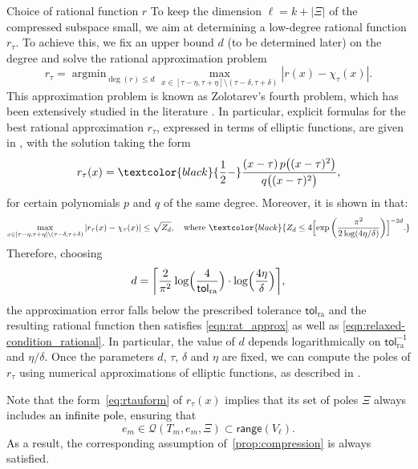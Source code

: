 \documentclass{siamart190516}
\newcommand{\argmin}{\mathop{\arg\min}}
\newcommand{\tol}{\mathsf{tol}}
\newcommand{\range}{\mathsf{range}}
\providecommand{\abs}[1]{\lvert#1\rvert}
\providecommand{\edit}[1]{\textcolor{black}{#1}}
\begin{document}
\begin{paragraph}{Choice of rational function $r$}
To keep the dimension $\ell = k + \abs{\Xi}$ of the compressed subspace small, we aim at determining a low-degree rational function $r_\tau$.
To achieve this, we fix an upper bound $d$ (to be determined later) on the degree and solve the rational approximation problem
\begin{equation*}
r_{\tau} = \argmin_{\deg(r) \le d}
\max_{x \in [\tau - \eta, \tau + \eta] \setminus (\tau - \delta, \tau + \delta)}
\left| r(x) - \chi_{\tau}(x) \right|.
\end{equation*}
This approximation problem is known as Zolotarev's fourth problem, which has been extensively studied in the literature \cite[Sec.~4.3]{petrushev2011rational}.
In particular, explicit formulas for the best rational approximation $r_\tau$, expressed in terms of elliptic functions, are given in \cite[Thm.~4.8]{petrushev2011rational}, with the solution taking the form
\begin{equation} \label{eq:rtauform}
r_{\tau}(x) =\edit{\frac{1}{2}-} \frac{(x - \tau)\, p\bigl((x - \tau)^2\bigr)}{q\bigl((x - \tau)^2\bigr)},
\end{equation}
for certain polynomials $p$ and $q$ of the same degree.
Moreover, it is shown in \cite[Thm.~3.3]{beckermann2017singular} that:
\begin{equation*}
\max_{x \in [\tau - \eta, \tau + \eta] \setminus (\tau - \delta, \tau + \delta)}
\left| r_{\tau}(x) - \chi_{\tau}(x) \right| \leq 
\sqrt{Z_{d}},\quad \text{where } 
\edit{
Z_{d} \leq 
4 \Bigl[\exp\left(\frac{\pi^2}{2 \log(4\eta/\delta)}\right)\Bigr]^{-2d}.}
\end{equation*}
Therefore, choosing
\begin{equation}
    \label{eq:bound_degree}
d = \biggl\lceil \frac{2}{\pi^2}\log\Bigl(\frac{4}{\tol_{\mathrm{ra}}}\Bigr) \cdot  \log\Bigl(\frac{4\eta}{\delta}\Bigr) \biggr\rceil,
\end{equation}
the approximation error falls below the prescribed tolerance $\tol_{\mathrm{ra}}$ and the resulting rational function then satisfies \cref{eqn:rat_approx} as well as \cref{eqn:relaxed-condition_rational}.
In particular, the value of $d$ depends logarithmically on $\tol_{\mathrm{ra}}^{-1}$ and $\eta/\delta$.
Once the parameters $d$, $\tau$, $\delta$ and $\eta$ are fixed, we can compute the poles of $r_\tau$ using numerical approximations of elliptic functions, as described in \cite{Nakatsukasa2016}.

Note that the form~\cref{eq:rtauform} of $r_{\tau}(x)$ implies that its set of poles $\Xi$ always includes \edit{an infinite pole}, ensuring that
\begin{equation*}
    e_{m}\in \mathcal{Q}(T_{m},e_m,\Xi) \subset \range(V_{\ell}).
\end{equation*}
As a result, the corresponding assumption of~\cref{prop:compression} is always satisfied.


\end{paragraph}
\end{document}
